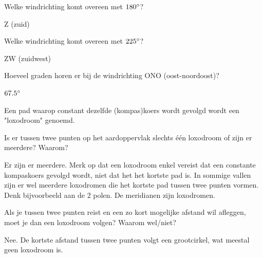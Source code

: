 \begin{opgave}
	\begin{subopgave}
		Welke windrichting komt overeen met $180\degree$?
		\begin{antwoord}
			Z (zuid)
		\end{antwoord}
	\end{subopgave}
	\begin{subopgave}
		Welke windrichting komt overeen met $225\degree$?
		\begin{antwoord}
			ZW (zuidwest)
		\end{antwoord}
	\end{subopgave}
	\begin{subopgave}
		Hoeveel graden horen er bij de windrichting ONO (oost-noordoost)?
		\begin{antwoord}
			$67.5\degree$
		\end{antwoord}
	\end{subopgave}
\end{opgave}

Een pad waarop constant dezelfde (kompas)koers wordt gevolgd wordt een "loxodroom" genoemd.

\begin{opgave}
	\begin{subopgave}
		Is er tussen twee punten op het aardoppervlak slechts \'e\'en loxodroom of  zijn er meerdere? Waarom?
		\begin{antwoord}
			Er zijn er meerdere. Merk op dat een loxodroom enkel vereist dat een constante kompaskoers gevolgd wordt, niet dat het het kortste pad is. In sommige vallen zijn er wel meerdere loxodromen die het kortste pad tussen twee punten vormen. Denk bijvoorbeeld aan de 2 polen. De meridianen zijn loxodromen.
		\end{antwoord}
	\end{subopgave}
	\begin{subopgave}
		Als je tussen twee punten reist en een zo kort mogelijke afstand wil afleggen, moet je dan een loxodroom volgen? Waarom wel/niet?
		\begin{antwoord}
			Nee. De kortste afstand tussen twee punten volgt een grootcirkel, wat meestal geen loxodroom is.
		\end{antwoord}
	\end{subopgave}
\end{opgave}

